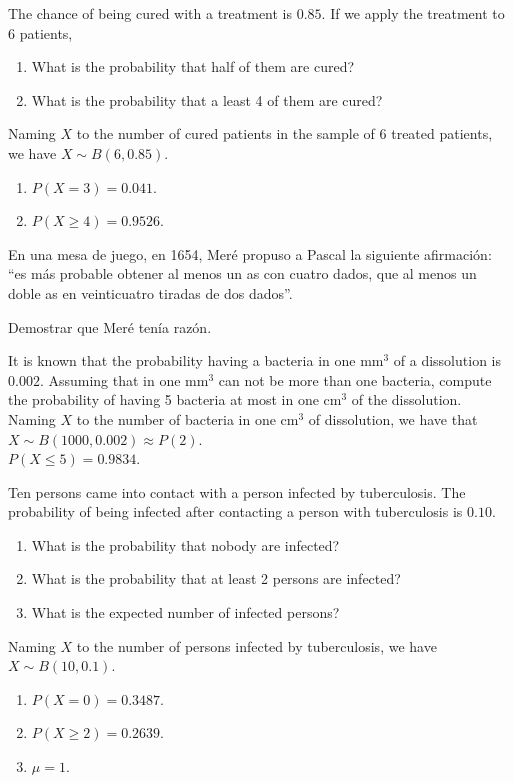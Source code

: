 {The chance of being cured with a treatment is $0.85$. 
If we apply the treatment to 6 patients,
\begin{enumerate}
\item What is the probability that half of them are cured?
\item What is the probability that a least 4 of them are cured?
\end{enumerate}
}
{Naming $X$ to the number of cured patients in the sample of 6 treated patients, we have $X\sim B(6,0.85)$.
\begin{enumerate}
\item $P(X=3)=0.041$.
\item $P(X\geq 4)=0.9526$.
\end{enumerate}
}
{}


{En una mesa de juego, en 1654, Meré propuso a Pascal la siguiente afirmación: ``es más probable obtener al menos un as con cuatro dados, que al menos un doble as en veinticuatro tiradas de dos dados''.

Demostrar que Meré tenía razón.
}
{}
{}


{It is known that the probability having a bacteria in one mm$^3$ of a dissolution is $0.002$.
Assuming that in one mm$^3$ can not be more than one bacteria, compute the probability of having 5 bacteria at most in one cm$^3$ of the dissolution.}
{Naming $X$ to the number of bacteria in one cm$^3$ of dissolution, we have that $X\sim B(1000,0.002)\approx P(2)$.\\
$P(X\leq 5)=0.9834$.
}
{}


{Ten persons came into contact with a person infected by tuberculosis. 
The probability of being infected after contacting a person with tuberculosis is $0.10$.
\begin{enumerate}
\item What is the probability that nobody are infected?
\item What is the probability that at least 2 persons are infected?
\item What is the expected number of infected persons? 
\end{enumerate}
}
{Naming $X$ to the number of persons infected by tuberculosis, we have $X\sim B(10,0.1)$. 
\begin{enumerate}
\item $P(X=0)=0.3487$. 
\item $P(X\geq 2)=0.2639$.
\item $\mu=1$.
\end{enumerate}
}
{}



